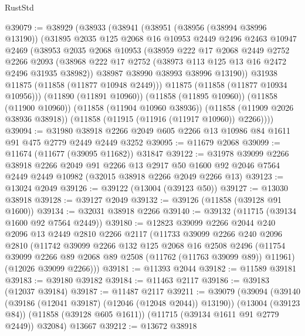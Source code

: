 \begin{lexlean}{RustStd}
\begin{coremodule}
@39079 := @38929
    (@38933
      (@38941
        (@38951
          (@38956 (@38994 @38996 @13190))
          (@31895
            @2035
            @125
            @2068
            @16
            @10953
            @2449
            @2496
            @2463
            @10947
            @2469
            (@38953
              @2035
              @2068
              @10953
              (@38959
                @222
                @17
                @2068
                @2449
                @2752
                @2266
                @2093
                (@38968 @222 @17 @2752 (@38973 @113 @125 @13 @16 @2472 @2496 @31935 @38982))
                @38987
                @38990
                @38993
                @38996
                @13190))
            @31938
            @11875
            (@11858 (@11877 @10948 @2449)))
          @11875
          (@11858 (@11877 @10934 @10956)))
        (@11890 (@11891 @10960))
        (@11858 (@11895 @10960))
        (@11858 (@11900 @10960))
        (@11858 (@11904 @10960 @38936))
        (@11858 (@11909 @2026 @38936 @38918))
        (@11858 (@11915 (@11916 (@11917 @10960)) @2266))))
@39094 := @31980 @38918 @2266 @2049 @605 @2266 @13 @10986 @84 @1611 @91 @475 @2779 @2449 @2449 @3252
@39095 := @11679 @2068
@39099 := @11674 (@11677 (@39095 @11682)) @31847
@39122 := @31978
    @39099
    @2266
    @38918
    @2266
    @2049
    @91
    @2266
    @13
    @2917
    @50
    @1600
    @92
    @2046
    @7564
    @2449
    @2449
    @10982
    (@32015 @38918 @2266 @2049 @2266 @13)
@39123 := @13024 @2049
@39126 := @39122 (@13004 (@39123 @50))
@39127 := @13030 @38918
@39128 := @39127 @2049
@39132 := @39126 (@11858 (@39128 @91 @1600))
@39134 := @32031 @38918 @2266
@39140 := @39132 (@11715 (@39134 @1600 @92 @7564 @2449))
@39180 := @12823
    @39099
    @2266
    @2044
    @240
    @2096
    @13
    @2449
    @2810
    @2266
    @2117
    (@11733
      @39099
      @2266
      @240
      @2096
      @2810
      (@11742
        @39099
        @2266
        @132
        @125
        @2068
        @16
        @2508
        @2496
        (@11754 @39099 @2266 @89 @2068 @89 @2508 (@11762 (@11763 @39099 @89)) @11961)
        (@12026 @39099 @2266)))
@39181 := @11393 @2044
@39182 := @11589 @39181
@39183 := @39180 @39182
@39184 := @11463 @2117
@39186 := @39183 (@12037 @39184)
@39187 := @11487 @2117
@39211 := @39079
    (@39094
      (@39140 (@39186 (@12041 @39187) (@12046 (@12048 @2044)) @13190))
      (@13004 (@39123 @84))
      (@11858 (@39128 @605 @1611))
      (@11715 (@39134 @1611 @91 @2779 @2449))
      @32084)
    @13667
@39212 := @13672 @38918

\end{coremodule}
\end{lexlean}
